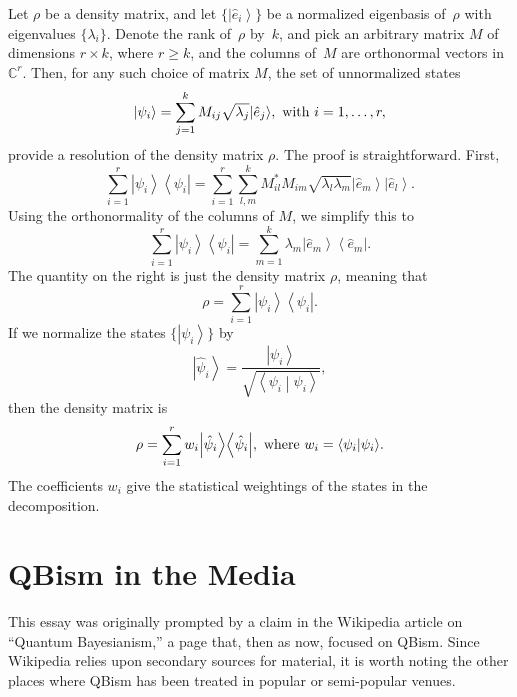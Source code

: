 \documentclass[aps,pra,superscriptaddress,12pt,tightenlines,nofootinbib]{revtex4}
\newcommand{\ket}[1]{{\ensuremath{\left| #1 \right\rangle}}}
\newcommand{\bra}[1]{{\ensuremath{\left\langle #1 \right|}}}
\newcommand{\braket}[2]{{\ensuremath{\left\langle #1 \middle| #2
      \right\rangle}}}
\begin{document}
Let $\rho$ be a density matrix, and let $\{\ket{\hat{e}_i}\}$ be a
normalized eigenbasis of~$\rho$ with eigenvalues $\{\lambda_i\}$.
Denote the rank of~$\rho$ by~$k$, and pick an arbitrary matrix $M$ of
dimensions $r \times k$, where $r \geq k$, and the columns of~$M$ are
orthonormal vectors in~$\mathbb{C}^r$.  Then, for any such choice of
matrix $M$, the set of unnormalized states
\begin{equation}
\ket{\psi_i} = \sum_{j=1}^k M_{ij} \sqrt{\lambda_j} \ket{\hat{e}_j},
\hbox{ with } i = 1,\ldots,r,
\end{equation}
provide a resolution of the density matrix $\rho$.  The proof is
straightforward.  First,
\begin{equation}
\sum_{i=1}^r \ket{\psi_i}\bra{\psi_i}
 = \sum_{i=1}^r \sum_{l,m}^k M_{il}^* M_{im} \sqrt{\lambda_l\lambda_m}
   \ket{\hat{e}_m}\ket{\hat{e}_l}.
\end{equation}
Using the orthonormality of the columns of $M$, we simplify this to
\begin{equation}
\sum_{i=1}^r \ket{\psi_i}\bra{\psi_i}
 = \sum_{m=1}^k \lambda_m \ket{\hat{e}_m}\bra{\hat{e}_m}.
\end{equation}
The quantity on the right is just the density matrix $\rho$, meaning
that
\begin{equation}
\rho = \sum_{i=1}^r \ket{\psi_i}\bra{\psi_i}.
\end{equation}
If we normalize the states $\{\ket{\psi_i}\}$ by
\begin{equation}
\ket{\hat{\psi}_i} =
 \frac{\ket{\psi_i}}{\sqrt{\braket{\psi_i}{\psi_i}}},
\end{equation}
then the density matrix is
\begin{equation}
\rho = \sum_{i=1}^r w_i \ket{\hat{\psi}_i}\bra{\hat{\psi}_i},
\hbox{ where } w_i = \braket{\psi_i}{\psi_i}.
\end{equation}
The coefficients $w_i$ give the statistical weightings of the states
in the decomposition.

\section{QBism in the Media}

This essay was originally prompted by a claim in the Wikipedia article
on ``Quantum Bayesianism,'' a page that, then as now, focused on
QBism.  Since Wikipedia relies upon secondary sources for material, it
is worth noting the other places where QBism has been treated in
popular or semi-popular venues.
\end{document}
